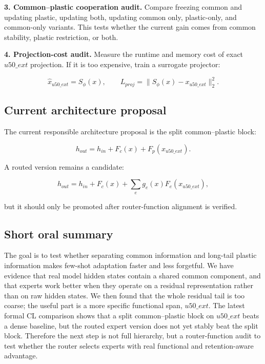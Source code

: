 \documentclass[11pt]{article}
\begin{document}
\textbf{3. Common--plastic cooperation audit.}
Compare freezing common and updating plastic, updating both, updating common only, plastic-only, and common-only variants. This tests whether the current gain comes from common stability, plastic restriction, or both.

\textbf{4. Projection-cost audit.}
Measure the runtime and memory cost of exact $u50\_ext$ projection. If it is too expensive, train a surrogate projector:

$$
\hat{x}_{u50\_ext}=S_\phi(x),
\qquad
L_{proj}=\|S_\phi(x)-x_{u50\_ext}\|_2^2.
$$

\subsection{Current architecture proposal}

The current responsible architecture proposal is the split common--plastic block:

$$
h_{out}
=
h_{in}
+
F_c(x)
+
F_p(x_{u50\_ext}).
$$

A routed version remains a candidate:

$$
h_{out}
=
h_{in}
+
F_c(x)
+
\sum_e g_e(x)F_e(x_{u50\_ext}),
$$

but it should only be promoted after router-function alignment is verified.

\subsection{Short oral summary}

The goal is to test whether separating common information and long-tail plastic information makes few-shot adaptation faster and less forgetful. We have evidence that real model hidden states contain a shared common component, and that experts work better when they operate on a residual representation rather than on raw hidden states. We then found that the whole residual tail is too coarse; the useful part is a more specific functional span, $u50\_ext$. The latest formal CL comparison shows that a split common--plastic block on $u50\_ext$ beats a dense baseline, but the routed expert version does not yet stably beat the split block. Therefore the next step is not full hierarchy, but a router-function audit to test whether the router selects experts with real functional and retention-aware advantage.
\end{document}
